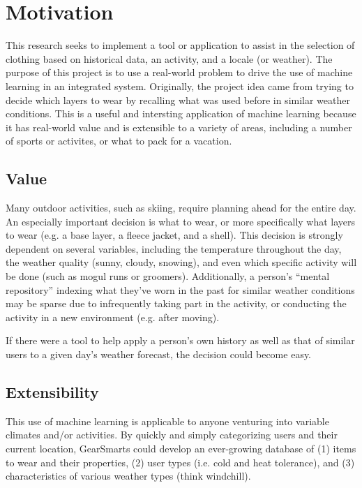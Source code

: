 \section{Motivation}
\label{section:motivation}
This research seeks to implement a tool or application to assist in the selection of clothing based on
historical data, an activity, and a locale (or weather). The purpose of this project is to use a real-world
problem to drive the use of machine learning in an integrated system. Originally, the project idea came from trying
to decide which layers to wear by recalling what was used before in similar weather conditions. This is a
useful and intersting application of machine learning because it has real-world value and is extensible to a variety
of areas, including a number of sports or activites, or what to pack for a vacation.

\subsection{Value}
Many outdoor activities, such as skiing, require planning ahead for the entire day. An especially important
decision is what to wear, or more specifically what layers to wear (e.g. a base layer, a fleece jacket, and a shell).
This decision is strongly dependent on several variables, including the temperature throughout the day, the weather
quality (sunny, cloudy, snowing), and even which specific activity will be done (such as mogul runs or groomers).
Additionally, a person's ``mental repository'' indexing what they've worn in the past for similar weather conditions
may be sparse due to infrequently taking part in the activity, or conducting the activity in a new environment (e.g.
after moving).

If there were a tool to help apply a person's own history as well as that of similar users to a given day's weather
forecast, the decision could become easy.

\subsection{Extensibility}
This use of machine learning is applicable to anyone venturing into variable climates and/or activities.
By quickly and simply categorizing
users and their current location, GearSmarts could develop an ever-growing database of (1) items to wear and their properties,
(2) user types (i.e. cold and heat tolerance), and (3) characteristics of various weather types (think windchill).

